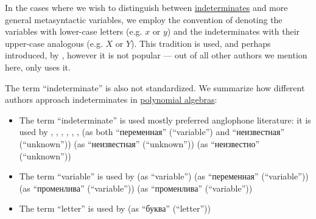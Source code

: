 \begin{remark}\label{rem:conventions_for_indeterminates}
  In the cases where we wish to distinguish between \hyperref[con:indeterminate]{indeterminates} and more general metasyntactic variables, we employ the convention of denoting the variables with lower-case letters (e.g. \( x \) or \( y \)) and the indeterminates with their upper-case analogous (e.g. \( X \) or \( Y \)). This tradition is used, and perhaps introduced, by , however it is not popular --- out of all other authors we mention here, only  uses it.

  The term \enquote{indeterminate} is also not standardized. We summarize how different authors approach indeterminates in \hyperref[def:polynomial_algebra]{polynomial algebras}:
  \begin{itemize}
    \item The term \enquote{indeterminate} is used mostly preferred anglophone literature:  it is used by
    ,
    ,
    ,
    ,
    ,
    ,
     (as both \enquote{переменная} (\enquote{variable}) and \enquote{неизвестная} (\enquote{unknown}))
     (as \enquote{неизвестная} (\enquote{unknown}))
     (as \enquote{неизвестно} (\enquote{unknown}))

    \item The term \enquote{variable} is used by
     (as \enquote{variable})
     (as \enquote{переменная} (\enquote{variable}))
     (as \enquote{променлива} (\enquote{variable}))
     (as \enquote{променлива} (\enquote{variable}))

    \item The term \enquote{letter} is used by
     (as \enquote{буква} (\enquote{letter}))
  \end{itemize}
\end{remark}

